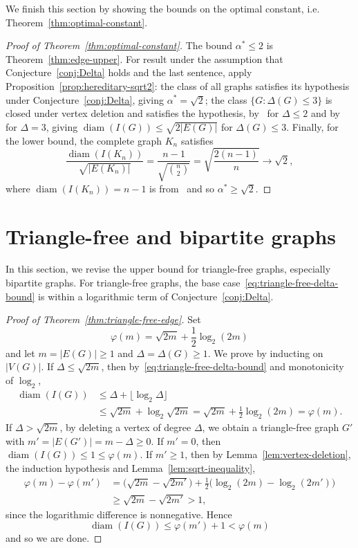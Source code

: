 \documentclass[11pt]{article}
\theoremstyle{remark}
\DeclareMathOperator{\diam}{diam}
\begin{document}
We finish this section by showing the bounds on the optimal constant, i.e.  Theorem~\ref{thm:optimal-constant}.   
\begin{proof}[Proof of Theorem~\ref{thm:optimal-constant}]
The bound $\alpha^*\le2$ is Theorem~\ref{thm:edge-upper}.
For  result under the assumption that Conjecture~\ref{conj:Delta} holds and the last sentence, apply Proposition~\ref{prop:hereditary-sqrt2}: the class of all graphs satisfies its hypothesis under Conjecture~\ref{conj:Delta}, giving $\alpha^*=\sqrt2$; the class $\{G:\Delta(G)\le3\}$ is closed under vertex deletion and satisfies the hypothesis, by~\cite{HavetHorschRambaud} for $\Delta\le2$ and by~\cite{WangWangYangLu} for $\Delta=3$, giving $\diam(I(G))\le\sqrt{2|E(G)|}$ for $\Delta(G)\le3$.
Finally, for the lower bound, the complete graph $K_n$ satisfies
\[
  \frac{\diam(I(K_n))}{\sqrt{|E(K_n)|}}
  =\frac{n-1}{\sqrt{\binom n2}}
  =\sqrt{\frac{2(n-1)}n}\longrightarrow\sqrt2,
\]
where $\diam(I(K_n))=n-1$ is from~\cite{HavetHorschRambaud}  and so $\alpha^*\ge\sqrt2$.
\end{proof}
 

\section{Triangle-free and bipartite graphs}\label{sec:triangle-free-bipartite}



In this section, we revise the upper bound   for triangle-free graphs, especially bipartite graphs. For triangle-free graphs, the base case~\eqref{eq:triangle-free-delta-bound} is within a logarithmic term of Conjecture~\ref{conj:Delta}.

\begin{proof}[Proof of Theorem~\ref{thm:triangle-free-edge}]
Set
\[
  \varphi(m)=\sqrt{2m}+\frac12\log_2(2m)
\]
and let $m=|E(G)|\ge1$ and $\Delta=\Delta(G)\ge1$. We prove by inducting  on $|V(G)|$. 
If $\Delta\le\sqrt{2m}$, then by~\eqref{eq:triangle-free-delta-bound} and monotonicity of $\log_2$,
\[
\begin{aligned}
  \diam(I(G))
  &\le \Delta+\lfloor\log_2\Delta\rfloor \\
  &\le \sqrt{2m}+\log_2\sqrt{2m}
   = \sqrt{2m}+\frac12\log_2(2m)=\varphi(m).
\end{aligned}
\]
If $\Delta>\sqrt{2m}$, by deleting a vertex of degree $\Delta$, we obtain a triangle-free graph $G'$ with
$m' =|E(G')|=m-\Delta\ge0$.
If $m'=0$, then $\diam(I(G))\le1\le\varphi(m)$.
If $m'\ge1$, then by Lemma~\ref{lem:vertex-deletion}, the induction hypothesis and Lemma~\ref{lem:sqrt-inequality},
\[
\begin{aligned}
  \varphi(m)-\varphi(m')
  &=\bigl(\sqrt{2m}-\sqrt{2m'}\bigr)
    +\frac12\bigl(\log_2(2m)-\log_2(2m')\bigr) \\
  &\ge \sqrt{2m}-\sqrt{2m'}>1,
\end{aligned}
\]
since the logarithmic difference is nonnegative.
Hence
\[
  \diam(I(G))\le\varphi(m')+1<\varphi(m) 
\]
and so we are done. 
\end{proof}
\end{document}
